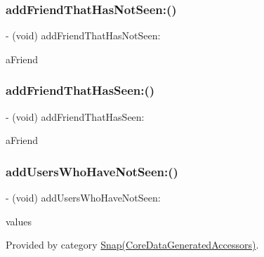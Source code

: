 \subsubsection{\texorpdfstring{add\+Friend\+That\+Has\+Not\+Seen\+:()}{addFriendThatHasNotSeen:()}}
{\footnotesize\ttfamily -\/ (void) add\+Friend\+That\+Has\+Not\+Seen\+: \begin{DoxyParamCaption}\item[{(\hyperlink{interface_friend}{Friend} $\ast$)}]{a\+Friend }\end{DoxyParamCaption}}

\hypertarget{interface_snap_a87bfdb9a2e8907d7d269c594f139ef76}{}\label{interface_snap_a87bfdb9a2e8907d7d269c594f139ef76} 
\subsubsection{\texorpdfstring{add\+Friend\+That\+Has\+Seen\+:()}{addFriendThatHasSeen:()}}
{\footnotesize\ttfamily -\/ (void) add\+Friend\+That\+Has\+Seen\+: \begin{DoxyParamCaption}\item[{(\hyperlink{interface_friend}{Friend} $\ast$)}]{a\+Friend }\end{DoxyParamCaption}}

\hypertarget{interface_snap_a76ddef740df9f189a1b411c93efdd593}{}\label{interface_snap_a76ddef740df9f189a1b411c93efdd593} 
\subsubsection{\texorpdfstring{add\+Users\+Who\+Have\+Not\+Seen\+:()}{addUsersWhoHaveNotSeen:()}}
{\footnotesize\ttfamily -\/ (void) add\+Users\+Who\+Have\+Not\+Seen\+: \begin{DoxyParamCaption}\item[{(N\+S\+Set$<$ \hyperlink{interface_friend}{Friend} $\ast$ $>$ $\ast$)}]{values }\end{DoxyParamCaption}}



Provided by category \hyperlink{category_snap_07_core_data_generated_accessors_08_a76ddef740df9f189a1b411c93efdd593}{Snap(\+Core\+Data\+Generated\+Accessors)}.


